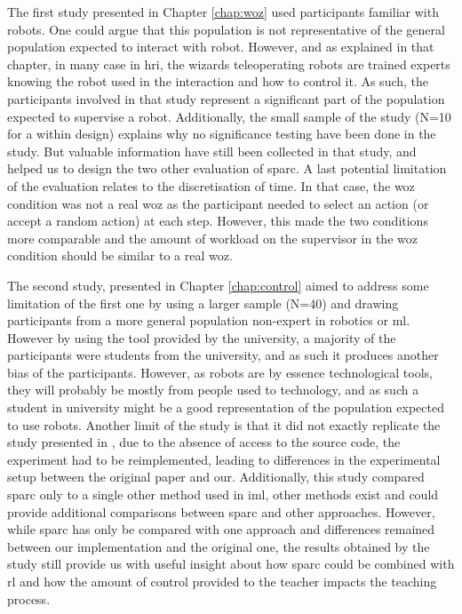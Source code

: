 The first study presented in Chapter \ref{chap:woz} used participants familiar with robots. One could argue that this population is not representative of the general population expected to interact with robot. However, and as explained in that chapter, in many case in \gls{hri}, the wizards teleoperating robots are trained experts knowing the robot used in the interaction and how to control it. As such, the participants involved in that study represent a significant part of the population expected to supervise a robot. Additionally, the small sample of the study (N=10 for a within design) explains why no significance testing have been done in the study. But valuable information have still been collected in that study, and helped us to design the two other evaluation of \gls{sparc}. A last potential limitation of the evaluation relates to the discretisation of time. In that case, the \gls{woz} condition was not a real \gls{woz} as the participant needed to select an action (or accept a random action) at each step. However, this made the two conditions more comparable and the amount of workload on the supervisor in the \gls{woz} condition should be similar to a real \gls{woz}.

The second study, presented in Chapter \ref{chap:control} aimed to address some limitation of the first one by using a larger sample (N=40) and drawing participants from a more general population non-expert in robotics or \gls{ml}. However by using the tool provided by the university, a majority of the participants were students from the university, and as such it produces another bias of the participants. However, as robots are by essence technological tools, they will probably be mostly from people used to technology, and as such a student in university might be a good representation of the population expected to use robots. Another limit of the study is that it did not exactly replicate the study presented in \cite{thomaz2008teachable}, due to the absence of access to the source code, the experiment had to be reimplemented, leading to differences in the experimental setup between the original paper and our. Additionally, this study compared \gls{sparc} only to a single other method used in \gls{iml}, other methods exist and could provide additional comparisons between \gls{sparc} and other approaches. However, while \gls{sparc} has only be compared with one approach and differences remained between our implementation and the original one, the results obtained by the study still provide us with useful insight about how \gls{sparc} could be combined with \gls{rl} and how the amount of control provided to the teacher impacts the teaching process.

